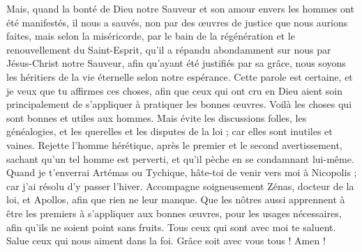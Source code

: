 \begin{multicols}{2}
Mais, quand la bonté de Dieu notre Sauveur et son amour envers les hommes ont été manifestés, il nous a sauvés,
non par des œuvres de justice que nous aurions faites, mais selon la miséricorde, par le bain de la régénération et le renouvellement du Saint-Esprit,
qu'il a répandu abondamment sur nous par Jésus-Christ notre Sauveur,
afin qu'ayant été justifiés par sa grâce, nous soyons les héritiers de la vie éternelle selon notre espérance.
Cette parole est certaine, et je veux que tu affirmes ces choses, afin que ceux qui ont cru en Dieu aient soin principalement de s'appliquer à pratiquer les bonnes œuvres. Voilà les choses qui sont bonnes et utiles aux hommes.
Mais évite les discussions folles, les généalogies, et les querelles et les disputes de la loi ; car elles sont inutiles et vaines.
Rejette l'homme hérétique, après le premier et le second avertissement,
sachant qu'un tel homme est perverti, et qu'il pèche en se condamnant lui-même.
Quand je t'enverrai Artémas ou Tychique, hâte-toi de venir vers moi à Nicopolis ; car j'ai résolu d'y passer l'hiver.
Accompagne soigneusement Zénas, docteur de la loi, et Apollos, afin que rien ne leur manque.
Que les nôtres aussi apprennent à être les premiers à s'appliquer aux bonnes œuvres, pour les usages nécessaires, afin qu'ils ne soient point sans fruits.
Tous ceux qui sont avec moi te saluent. Salue ceux qui nous aiment dans la foi. Grâce soit avec vous tous ! Amen !
\PPE{}
\end{multicols}
